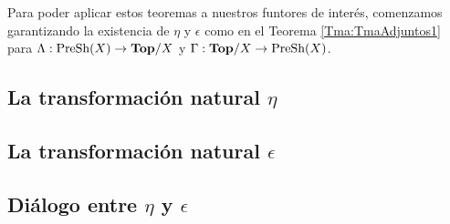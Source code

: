 Para poder aplicar estos teoremas a nuestros funtores de interés, comenzamos garantizando la existencia de $\eta$ y $\epsilon$ como en el Teorema \ref{Tma:TmaAdjuntos1} para $\Lambda:\normalfont{\text{PreSh}}(X)\to\normalfont{\textbf{Top}}/X$ y $\Gamma:\normalfont{\textbf{Top}}/X\to\normalfont{\text{PreSh}}(X)$.

\subsection{La transformación natural $\eta$}
   
\subsection{La transformación natural $\epsilon$}
   
\subsection{Diálogo entre $\eta$ y $\epsilon$}
   

